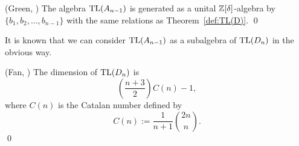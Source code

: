\begin{theorem}{\rm (Green, \cite{Green2006a})}
The algebra $\operatorname{TL}(A_{n-1})$ is generated as a unital $\mathbb{Z}[\delta]$-algebra by $\{b_{1}, b_{2}, \dots, b_{n-1}\}$ with the same relations as Theorem~\ref{def:TL(D)}.
\qed
\end{theorem}


 It is known that we can consider $\operatorname{TL}(A_{n-1})$ as a subalgebra of $\operatorname{TL}(D_{n})$ in the obvious way.


\begin{theorem}{\rm (Fan, \cite{Fan1997})}
The dimension of $\operatorname{TL}(D_n)$ is 
\[
\left(\frac{n+3}{2}\right)C(n)-1,
\]
where $C(n)$ is the Catalan number defined by
\[
C(n):=\frac{1}{n+1}{2n\choose n}.
\]\qed
\end{theorem}




